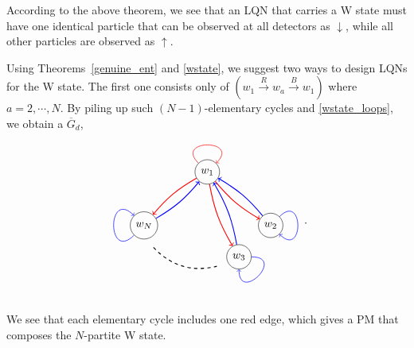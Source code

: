 \documentclass[a4paper,twocolumn,8pt,accepted=2021-12-15]{quantumarticle}
\def\dc{{\overline{G}_d }}
\begin{document}
	According to the above theorem, we see that an LQN that carries a W state must have one identical particle that can be observed at all detectors as $\downarrow$, while all other particles are observed as $\uparrow$.
	
	Using  Theorems~\ref{genuine_ent} and \ref{wstate}, we suggest two ways to design LQNs for the W state.
	The first one consists only of $(w_1\xrightarrow{R} w_a\xrightarrow{B} w_1)$ where $a=2,\cdots, N$. By piling up such $(N-1)$-elementary cycles and \eqref{wstate_loops}, we obtain a $\dc$, 
	\begin{align}\label{wstate_1}
		\begin{tikzpicture}[baseline={([yshift=-.5ex]current bounding box.center)}]
			\node[circle,draw] (a) at (6,2.7) {$w_1$};
			\node[circle,draw] (b) at (8,1) {$w_2$};		
			\node[circle,draw] (c) at (7,0) {$w_3$};
			\node[circle,draw] (e) at (4,1) {$w_N$};		
			\path[every loop/.style={min distance=10mm,in=45,out=135,looseness=5,color=red,->},line width = 0.5pt] (a) edge [loop above]   (a);
			\path[every loop/.style={min distance=10mm,in=-45,out=45,looseness=5,color=blue},line width = 0.5pt,->] (b) edge [loop above] (b);
			\path[every loop/.style={min distance=10mm,in=270,out=0,looseness=5,color=blue ,->},line width = 0.5pt] (c) edge [loop above]  (c);
			\path[every loop/.style={min distance=10mm,in=135,out=-135,looseness=5,color=blue ,->},line width = 0.5pt] (e) edge [loop above]  (e);	
			\draw[thick, dashed] (4.3,0.3) to[bend right=30] (6.3,-.3);	
			\path[line width = 0.8pt,->,color=red] (a) edge [bend right=10] (b);
			\path[line width = 0.8pt,->,color=red] (a) edge [bend right=10] (c);
			\path[line width = 0.8pt,->,color=red] (a) edge [bend right=10] (e);
			\path[line width = 0.8pt,->,color=blue] (b) edge [bend right=10] (a);
			\path[line width = 0.8pt,->,color=blue] (c) edge [bend right=10] (a);
			\path[line width = 0.8pt,->,color=blue] (e) edge [bend right=10] (a);							
		\end{tikzpicture}.
	\end{align}
	We see that each elementary cycle includes one red edge, which gives a PM that composes the $N$-partite W state.
	
\end{document}
